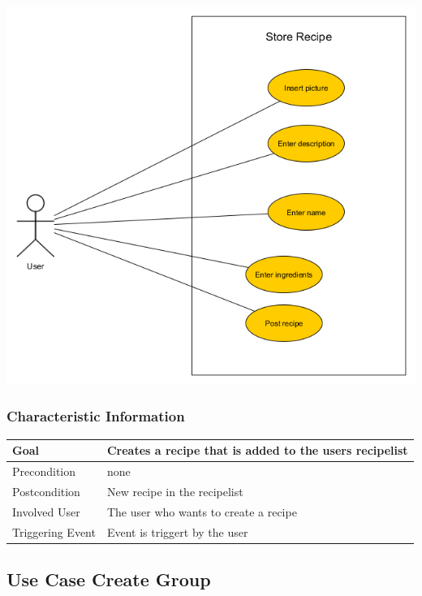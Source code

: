 \documentclass[12pt]{article}
\theoremstyle{definition}
\begin{document}
\includegraphics[scale=.5]{UseCaseStoreRecipe.png}\\


\subsubsection{Characteristic Information}

\begin{tabular}{|l|l|}
\hline
Goal & Creates a recipe that is added to the users recipelist  \\ \hline
Precondition & none \\ \hline
Postcondition & New recipe in the recipelist \\ \hline
Involved User & The user who wants to create a recipe \\ \hline
Triggering Event & Event is triggert by the user \\ \hline
\end{tabular}

\subsection{Use Case Create Group}
\end{document}
